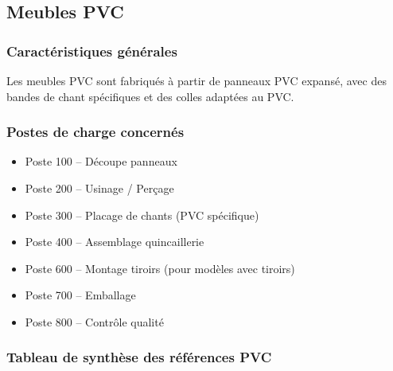 \documentclass[12pt,a4paper]{article}
\begin{document}
\subsection{Meubles PVC}

\subsubsection{Caractéristiques générales}
Les meubles PVC sont fabriqués à partir de panneaux PVC expansé, avec des bandes de chant spécifiques et des colles adaptées au PVC.

\subsubsection{Postes de charge concernés}
\begin{itemize}
    \item Poste 100 – Découpe panneaux
    \item Poste 200 – Usinage / Perçage
    \item Poste 300 – Placage de chants (PVC spécifique)
    \item Poste 400 – Assemblage quincaillerie
    \item Poste 600 – Montage tiroirs (pour modèles avec tiroirs)
    \item Poste 700 – Emballage
    \item Poste 800 – Contrôle qualité
\end{itemize}

\subsubsection{Tableau de synthèse des références PVC}
\end{document}
